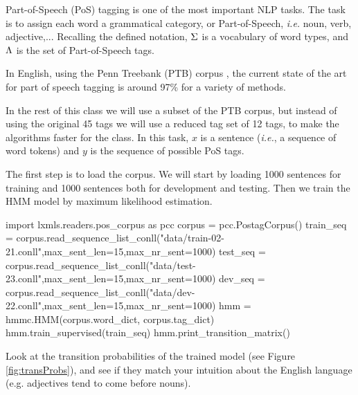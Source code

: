 Part-of-Speech (PoS) tagging is one of the most important NLP tasks. The
task is to assign each word a grammatical category, or Part-of-Speech, \emph{i.e.} noun,
verb, adjective,... Recalling the defined notation, $\Sigma$ is a 
vocabulary of word types, and 
$\Lambda$ is the set of Part-of-Speech tags.

In English, using the Penn Treebank (PTB) corpus \citep{pennTreeBank}, the current
state of the art for part of speech tagging is around 97\% for a
variety of methods.

In the rest of this class we will use a subset of the PTB corpus, but
instead of using the original 45 tags we will use a reduced tag set of
12 tags, to make the algorithms faster for the
class. In this task, $x$ is a sentence (\emph{i.e.}, a sequence of word tokens) and $y$
is the sequence of possible PoS tags.

The first step is to load the corpus. We will start by loading
1000 sentences for training and 1000 sentences both for development and
testing. Then we train the HMM model by maximum likelihood estimation.
\begin{python}
import lxmls.readers.pos_corpus as pcc
corpus = pcc.PostagCorpus()
train_seq = corpus.read_sequence_list_conll("data/train-02-21.conll",max_sent_len=15,max_nr_sent=1000)
test_seq = corpus.read_sequence_list_conll("data/test-23.conll",max_sent_len=15,max_nr_sent=1000)
dev_seq = corpus.read_sequence_list_conll("data/dev-22.conll",max_sent_len=15,max_nr_sent=1000)
hmm = hmmc.HMM(corpus.word_dict, corpus.tag_dict)
hmm.train_supervised(train_seq)
hmm.print_transition_matrix()
\end{python}


Look at the transition probabilities of the trained model
 (see
Figure \ref{fig:transProbs}), and see if they match your intuition
about the English language (e.g. adjectives tend to come before nouns).

